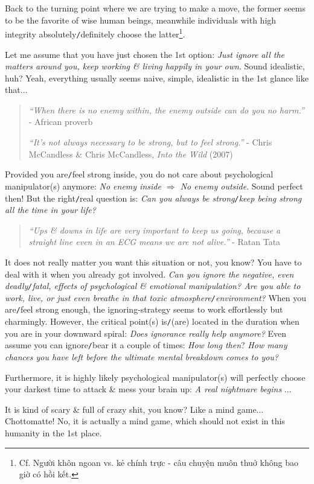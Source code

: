 \documentclass[12pt,twoside]{book}
\begin{document}
Back to the turning point where we are trying to make a move, the former seems to be the favorite of wise human beings, meanwhile individuals with high integrity absolutely{\tt/}definitely choose the latter\footnote{Cf. Người khôn ngoan vs. kẻ chính trực - câu chuyện muôn thuở không bao giờ có hồi kết.}.

Let me assume that you have just chosen the 1st option: {\it Just ignore all the matters around you, keep working \& living happily in your own}. Sound idealistic, huh? Yeah, everything usually seems naive, simple, idealistic in the 1st glance like that$\ldots$
\begin{quotation}
	{\it``When there is no enemy within, the enemy outside can do you no harm.''} - African proverb
	
	{\it``It's not always necessary to be strong, but to feel strong.''} - {\sc Chris McCandless} \& {\sf Chris McCandless}, {\it Into the Wild} (2007)
\end{quotation}
Provided you are{\tt/}feel strong inside, you do not care about psychological manipulator(s) anymore: {\it No enemy inside $\Rightarrow$ No enemy outside}. Sound perfect then! But the right{\tt/}real question is: {\it Can you always be strong{\tt/}keep being strong all the time in your life?}
\begin{quotation}
	{\it``Ups \& downs in life are very important to keep us going, because a straight line even in an ECG means we are not alive.''} - {\sc Ratan Tata}
\end{quotation}
It does not really matter you want this situation or not, you know? You have to deal with it when you already got involved. {\it Can you ignore the negative, even deadly{\tt/}fatal, effects of psychological \& emotional manipulation? Are you able to work, live, or just even breathe in that toxic atmosphere{\tt/}environment?} When you are{\tt/}feel strong enough, the ignoring-strategy seems to work effortlessly but charmingly. However, the critical point(s) is{\tt/}(are) located in the duration when you are in your downward spiral: {\it Does ignorance really help anymore?} Even assume you can ignore{\tt/}bear it a couple of times: {\it How long then}? {\it How many chances you have left before the ultimate mental breakdown comes to you?}

Furthermore, it is highly likely psychological manipulator(s) will perfectly choose your darkest time to attack \& mess your brain up: {\it A real nightmare begins} $\ldots$

It is kind of scary \& full of crazy shit, you know? Like a mind game$\ldots$ Chottomatte! No, it is actually a mind game, which should not exist in this humanity in the 1st place.
\end{document}
